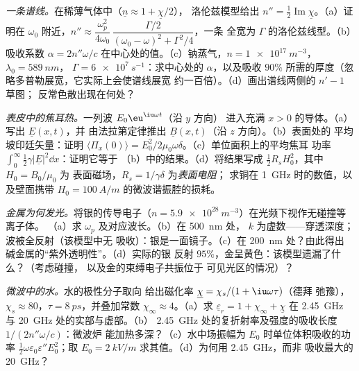 \begin{exercise}[$\star\star$]\label{exo:b2:waves-in-media:9}
\emph{一条谱线。}在稀薄气体中（$\underline n \approx 1 + \underline\chi/2$），
洛伦兹模型给出 $n'' = \tfrac12\operatorname{Im}\underline\chi$。（a）证明在
$\omega_0$ 附近，$n'' \approx \dfrac{\omega_p^2}{4\omega_0}\,\dfrac{\Gamma/2}{(\omega_0 - \omega)^2 + \Gamma^2/4}$，一条
全宽为 $\Gamma$ 的洛伦兹线型。（b）吸收系数 $\alpha = 2n''\omega/c$
在中心处的值。（c）钠蒸气，$n = \qty{1e17}{m^{-3}}$，$\lambda_0 = \qty{589}{nm}$，
$\Gamma = \qty{6e7}{s^{-1}}$：求中心处的 $\alpha$，以及吸收
$90\%$ 所需的厚度（忽略多普勒展宽，它实际上会使谱线展宽
约一百倍）。（d）画出谱线两侧的 $n' - 1$ 草图；
反常色散出现在何处？
\end{exercise}

\begin{exercise}[$\star\star\star$]\label{exo:b2:waves-in-media:10}
\emph{表皮中的焦耳热。}一列波 $E_0\eu^{\iu\omega t}$（沿 $y$ 方向）
进入充满 $x > 0$ 的导体。（a）写出 $\underline E(x, t)$，并
由法拉第定律推出 $\underline B(x, t)$（沿 $z$ 方向）。（b）表面处的
平均坡印廷矢量：证明 $\langle\Pi_x(0)\rangle = E_0^2/2\mu_0\omega\delta$。（c）单位面积上的平均焦耳
功率 $\int_0^\infty\tfrac12\gamma|\underline E|^2\dd x$：证明它等于
（b）中的结果。（d）将结果写成 $\tfrac12R_sH_0^2$，其中 $H_0 = B_0/\mu_0$ 为
表面磁场，$R_s = 1/\gamma\delta$ 为\emph{表面电阻}；
求铜在 \qty{1}{GHz} 时的数值，以及壁面携带
$H_0 = \qty{100}{A/m}$ 的微波谐振腔的损耗。
\end{exercise}

\begin{exercise}[$\star\star\star$]\label{exo:b2:waves-in-media:11}
\emph{金属为何发光。}将银的传导电子（$n =
\qty{5.9e28}{m^{-3}}$）在光频下视作无碰撞等离子体。
（a）求 $\omega_p$ 及对应波长。（b）在 \qty{500}{nm} 处，
$k$ 为虚数——穿透深度；波被全反射（该模型中无
吸收）：银是一面镜子。（c）在 \qty{200}{nm} 处？由此得出
碱金属的“紫外透明性”。（d）实际的银
反射 $95\%$，金呈黄色：该模型遗漏了什么？（考虑碰撞，
以及金的束缚电子共振位于
可见光区的情况）？
\end{exercise}

\begin{exercise}[$\star\star\star$]\label{exo:b2:waves-in-media:12}
\emph{微波中的水。}水的极性分子取向
给出磁化率 $\underline\chi = \chi_s/(1 + \iu\omega\tau)$（德拜
弛豫），$\chi_s \approx 80$，$\tau = \qty{8}{ps}$，并叠加常数
$\chi_\infty \approx 4$。（a）求 $\underline\varepsilon_r = 1 + \chi_\infty
+ \underline\chi$ 在 \qty{2.45}{GHz} 与 \qty{20}{GHz} 处的实部与虚部。（b）
\qty{2.45}{GHz} 处的复折射率及强度的吸收长度 $1/(2n''\omega/c)$：微波炉
能加热多深？（c）水中场振幅为 $E_0$ 时单位体积吸收的功率
$\tfrac12\omega\varepsilon_0\varepsilon''E_0^2$；取
$E_0 = \qty{2}{kV/m}$ 求其值。（d）为何用 \qty{2.45}{GHz}，而非
吸收最大的 \qty{20}{GHz}？
\end{exercise}

